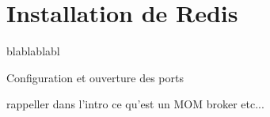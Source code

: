 \section{Installation de Redis}
blablablabl

Configuration et ouverture des ports




rappeller dans l'intro ce qu'est un MOM broker etc...
